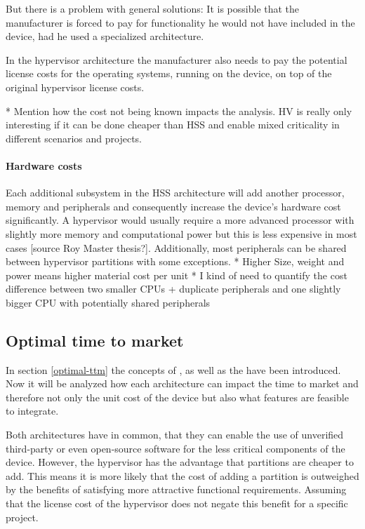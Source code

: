 But there is a problem with general solutions: It is possible that the manufacturer is forced to pay for functionality he would not have included in the device, had he used a specialized architecture. 

In the hypervisor architecture the manufacturer also needs to pay the potential license costs for the operating systems, running on the device, on top of the original hypervisor license costs.
 

* Mention how the cost not being known impacts the analysis. HV is really only interesting if it can be done cheaper than HSS and enable mixed criticality in different scenarios and projects. 

\paragraph{Hardware costs}
Each additional subsystem in the \gls{HSS} architecture will add another processor, memory and peripherals and consequently increase the device's hardware cost significantly. A hypervisor would usually require a more advanced processor with slightly more memory and computational power but this is less expensive in most cases [source Roy Master thesis?]. Additionally, most peripherals can be shared between hypervisor partitions with some exceptions.
* Higher Size, weight and power means higher material cost per unit
	* I kind of need to quantify the cost difference between two smaller CPUs 		+ duplicate peripherals and one slightly bigger CPU with potentially 		shared peripherals

\subsection{Optimal time to market}
In section \ref{optimal-ttm} the concepts of , as well as the have been introduced. Now it will be analyzed how each architecture can impact the time to market and therefore not only the unit cost of the device but also what features are feasible to integrate.

Both architectures have in common, that they can enable the use of unverified third-party or even open-source software for the less critical  components of the device. However, the hypervisor has the advantage that partitions are cheaper to add. This means it is more likely that the cost of adding a partition is outweighed by the benefits of satisfying more attractive functional requirements. Assuming that the license cost of the hypervisor does not negate this benefit for a specific project.

